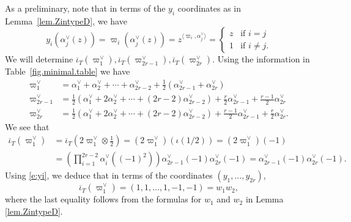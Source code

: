 \documentclass[reqno,11pt]{amsart}
\theoremstyle{remark}
\theoremstyle{remark}
\theoremstyle{definition}
\theoremstyle{definition}
\theoremstyle{definition}
\numberwithin{equation}{section}
\newcommand{\ga}{\alpha}
\def\ibarT{\overline{\iota}_T}
\begin{document}
As a preliminary, note that in terms of the $y_i$ coordinates as in Lemma~\ref{lem.ZintypeD}, we have
\begin{equation} \label{e:yi}
y_i(\ga_j^{\vee}(z)) = \varpi_{i}(\ga_j^{\vee}(z)) = z^{\langle \varpi_i, \ga_j^{\vee} \rangle} = \begin{cases}
z & \mbox{if } i = j \\
1 & \mbox{if } i \neq j.
\end{cases}
\end{equation}
We will determine $\ibarT(\varpi_1^{\vee}), \ibarT(\varpi_{2r-1}^{\vee}), \ibarT(\varpi_{2r}^{\vee})$.
Using the information in Table~\ref{fig.minimal.table} we have
\begin{align*}
\varpi_1^{\vee} &= \ga_1^{\vee} + \ga_2^{\vee} + \cdots+  \ga_{2r-2}^{\vee}   + \frac{1}{2} (\ga_{2r-1}^{\vee} + \ga_{2r}^{\vee}) \\
\varpi_{2r-1}^{\vee} & = \frac{1}{2}( \ga_1^{\vee} +  2 \ga_2^{\vee} + \cdots +  (2r-2)  \ga_{2r-2}^{\vee}) + \frac{r}{2} \ga_{2r-1}^{\vee} + \frac{r-1}{2}\ga_{2r}^{\vee} \\
\varpi_{2r}^{\vee} & = \frac{1}{2}( \ga_1^{\vee} +  2 \ga_2^{\vee} +  \cdots +  (2r-2)  \ga_{2r-2}^{\vee}) +  \frac{r-1}{2} \ga_{2r-1}^{\vee} + \frac{r}{2}  \ga_{2r}^{\vee}.
\end{align*}
We see that
\begin{align*}
\ibarT(\varpi_1^{\vee}) & = \ibarT\left(2 \varpi_1^{\vee} \otimes \frac{1}{2}\right) = (2 \varpi_1^{\vee} ) (\iota(1/2) ) = (2 \varpi_1^{\vee} ) (-1) \\
& =  \left( \prod_{i = 1}^{2r-2} \ga_i^\vee((-1)^2) \right) \ga_{2r-1}^{\vee}(-1) \ga_{2r}^{\vee}(-1)  =  \ga_{2r-1}^{\vee}(-1) \ga_{2r}^{\vee}(-1) .
\end{align*}
Using \eqref{e:yi}, we deduce that in terms of the coordinates $(y_1, \ldots, y_{2r})$, 
$$
\ibarT(\varpi_1^{\vee}) = (1, 1, \ldots, 1, -1, -1) = w_1 w_2,
$$
where the last equality follows from the formulas for $w_1$ and $w_2$ in Lemma \ref{lem.ZintypeD}. 
\end{document}

